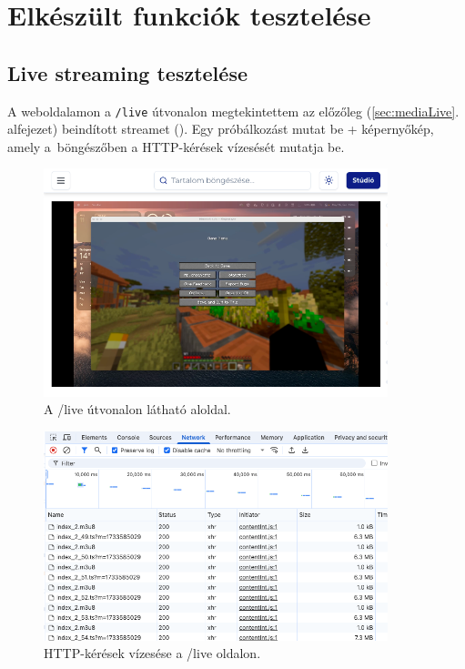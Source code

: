 \chapter{Elkészült funkciók tesztelése}

\section{Live streaming tesztelése}

A weboldalamon a \verb|/live| útvonalon megtekintettem az előzőleg (\ref{sec:mediaLive}. alfejezet) beindított streamet (). Egy próbálkozást mutat be \az+ képernyőkép, amely a~böngészőben a HTTP-kérések vízesését\cite{waterfall} mutatja be.

\begin{figure}[h]
  \centering
  \includegraphics[width=100mm, keepaspectratio]{figures/waterfall1.png}
  \caption{A /live útvonalon látható aloldal.}
  \label{fig:waterfall1}
\end{figure}

\begin{figure}[h]
  \centering
  \includegraphics[width=100mm, keepaspectratio]{figures/waterfall2.png}
  \caption{HTTP-kérések vízesése a /live oldalon.}
  \label{fig:waterfall2}
\end{figure}

